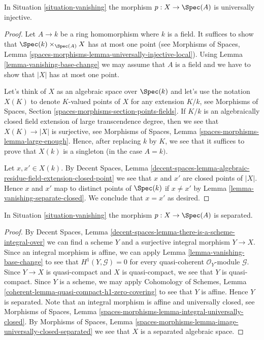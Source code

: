 \begin{lemma}
\label{lemma-vanishing-injective}
In Situation \ref{situation-vanishing} the morphism $p : X \to \Spec(A)$ is
universally injective.
\end{lemma}

\begin{proof}
Let $A \to k$ be a ring homomorphism where $k$ is a field. It suffices to
show that $\Spec(k) \times_{\Spec(A)} X$ has at most one point (see
Morphisms of Spaces, Lemma
\ref{spaces-morphisms-lemma-universally-injective-local}).
Using Lemma \ref{lemma-vanishing-base-change} we may assume that $A$
is a field and we have to show that $|X|$ has at most one point.

\medskip\noindent
Let's think of $X$ as an algebraic space over $\Spec(k)$ and let's
use the notation $X(K)$ to denote $K$-valued points of $X$
for any extension $K/k$, see
Morphisms of Spaces, Section \ref{spaces-morphisms-section-points-fields}.
If $K/k$ is an algebraically closed field extension
of large transcendence degree, then we see that $X(K) \to |X|$
is surjective, see Morphisms of Spaces, Lemma
\ref{spaces-morphisms-lemma-large-enough}. Hence, after replacing $k$
by $K$, we see that it suffices to prove that $X(k)$ is a singleton
(in the case $A = k)$.

\medskip\noindent
Let $x, x' \in X(k)$. By Decent Spaces, Lemma
\ref{decent-spaces-lemma-algebraic-residue-field-extension-closed-point}
we see that $x$ and $x'$ are closed points of $|X|$. Hence $x$ and $x'$
map to distinct points of $\Spec(k)$ if $x \not = x'$ by
Lemma \ref{lemma-vanishing-separate-closed}. We conclude that
$x = x'$ as desired.
\end{proof}

\begin{lemma}
\label{lemma-vanishing-separated}
In Situation \ref{situation-vanishing} the morphism $p : X \to \Spec(A)$ is
separated.
\end{lemma}

\begin{proof}
By Decent Spaces, Lemma
\ref{decent-spaces-lemma-there-is-a-scheme-integral-over}
we can find a scheme $Y$ and a surjective integral morphism
$Y \to X$. Since an integral morphism is affine, we can apply
Lemma \ref{lemma-vanishing-base-change}
to see that $H^1(Y, \mathcal{G}) = 0$ for every
quasi-coherent $\mathcal{O}_Y$-module $\mathcal{G}$.
Since $Y \to X$ is quasi-compact and $X$ is quasi-compact,
we see that $Y$ is quasi-compact.
Since $Y$ is a scheme, we may apply
Cohomology of Schemes, Lemma
\ref{coherent-lemma-quasi-compact-h1-zero-covering}
to see that $Y$ is affine. Hence $Y$ is separated.
Note that an integral morphism is affine and universally closed, see
Morphisms of Spaces, Lemma
\ref{spaces-morphisms-lemma-integral-universally-closed}.
By Morphisms of Spaces, Lemma
\ref{spaces-morphisms-lemma-image-universally-closed-separated}
we see that $X$ is a separated algebraic space.
\end{proof}

